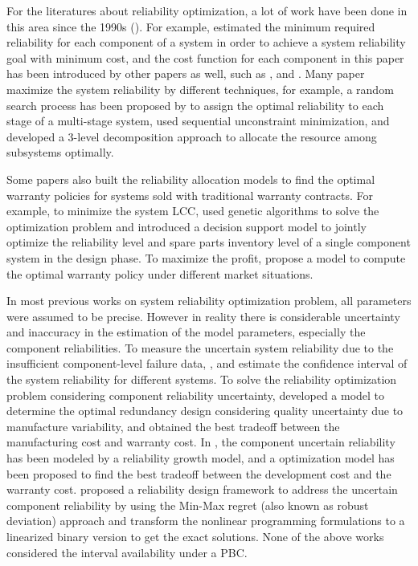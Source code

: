 \documentclass[preprint,12pt]{elsarticle}
\begin{document}
 For the literatures about reliability optimization, a lot of work have been done in this area since the 1990s (\citet{Kuo}). For example, \citet{Mettas} estimated the minimum required reliability for each component of a system in order to achieve a system reliability goal with minimum cost, and the cost function for each component in this paper has been introduced by other papers as well, such as \citet{Huang}, \citet{Oner2010} and \citet{Jin}. Many paper maximize the system reliability by different techniques, for example, a random search process has been proposed by \citet{Beraha} to assign the optimal reliability to each stage of a multi-stage system, \citet{Hwang} used sequential unconstraint minimization, and \citet{Li} developed a 3-level decomposition approach to allocate the resource among subsystems optimally.

Some papers also built the reliability allocation models to find the optimal warranty policies for systems sold with traditional warranty contracts. For example, to minimize the system LCC, \citet{Zuo1998} used genetic algorithms to solve the optimization problem and \citet{Oner2010} introduced a decision support model to jointly optimize the reliability level and spare parts inventory level of a single component system in the design phase. To maximize the profit, \citet{Huang} propose a model to compute the optimal warranty policy under different market situations.

In most previous works on system reliability optimization problem, all parameters were assumed to be precise. However in reality there is considerable uncertainty and inaccuracy in the estimation of the model parameters, especially the component reliabilities. To measure the uncertain system reliability due to the insufficient component-level failure data, \citet{Coit1997}, \citet{Jinandcoit} and \citet{Ramirez-Marquez2008} estimate the confidence interval of the system reliability for different systems.
To solve the reliability optimization problem considering component reliability uncertainty, \citet{Murthy1998} developed a model to determine the optimal redundancy design considering quality uncertainty due to manufacture variability, and obtained the best tradeoff between the manufacturing cost and warranty cost. In \citet{Murthy2003}, the component uncertain reliability has been modeled by a reliability growth model, and a optimization model has been proposed to find the best tradeoff between the development cost and the warranty cost. \citet{Feizollahi} proposed a reliability design framework to address the uncertain component reliability by using the Min-Max regret (also known as robust deviation) approach and transform the nonlinear programming formulations to a linearized binary version to get the exact solutions. None of the above works considered the interval availability under a PBC.
\end{document}

